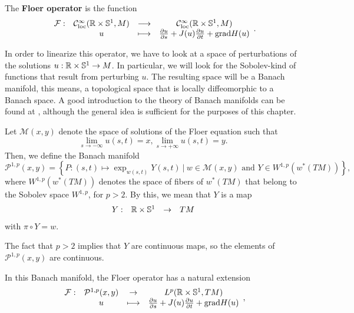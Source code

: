\begin{deff} \label{deff:floer_operator}
The {\bf Floer operator} is the function
\[\begin{array}{rccc} \mathcal{F} : & \mathcal{C}^{\infty}_{\mathrm{loc}}(\mathbb{R}\times\mathbb{S}^1,M) & \longrightarrow & \mathcal{C}^{\infty}_{\mathrm{loc}}(\mathbb{R}\times\mathbb{S}^1,M) \\ & u & \longmapsto & \frac{\partial u}{\partial s} + J(u) \frac{\partial u}{\partial t} + \mathrm{grad} H (u) \end{array} .\]
\end{deff}

In order to linearize this operator, we have to look at a space of perturbations of the solutions $u : \mathbb{R} \times \mathbb{S}^1 \rightarrow M$. In particular, we will look for the Sobolev-kind of functions that result from perturbing $u$. The resulting space will be a Banach manifold, this means, a topological space that is locally diffeomorphic to a Banach space. A good introduction to the theory of Banach manifolds can be found at \cite{abraham2012manifolds}, although the general idea is sufficient for the purposes of this chapter.

\begin{deff}
Let $\mathcal{M}(x,y)$ denote the space of solutions of the Floer equation such that
\[\lim_{s \rightarrow -\infty} u(s,t) = x, \lim_{s \rightarrow +\infty} u(s,t) = y.\]
Then, we define the Banach manifold
\[\mathcal{P}^{1,p}(x,y) = \left\{P : (s,t) \mapsto \exp_{w(s,t)}Y(s,t) \ | \ w \in \mathcal{M}(x,y) \text{ and } Y \in W^{1,p}(w^{\ast}(TM))\right\} ,\]
where $W^{1,p}(w^{\ast}(TM))$ denotes the space of fibers of $w^{\ast}(TM)$ that belong to the Sobolev space $W^{1,p}$, for $p > 2$. By this, we mean that $Y$ is a map
\[\begin{array}{rccc} Y : & \mathbb{R} \times \mathbb{S}^1 & \rightarrow & TM \end{array}\]
with $\pi \circ Y = w$.
\end{deff}

\begin{rmrk}
The fact that $p > 2$ implies that $Y$ are continuous maps, so the elements of $\mathcal{P}^{1,p}(x,y)$ are continuous.
\end{rmrk}

In this Banach manifold, the Floer operator has a natural extension
\[\begin{array}{rccc} \mathcal{F} : & \mathcal{P}^{1,p}(x,y) & \rightarrow & L^p(\mathbb{R} \times \mathbb{S}^1, TM) \\ & u & \longmapsto & \frac{\partial u}{\partial s} + J(u)\frac{\partial u}{\partial t} + \mathrm{grad} H(u) \end{array} ,\]

